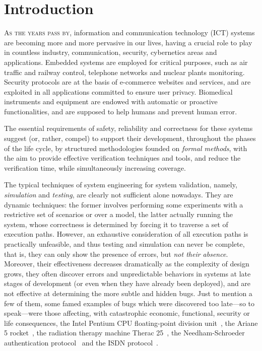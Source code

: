 \chapter{Introduction}
\label{chap:introFOR}
\minitoc\mtcskip

\lettrine[lines=3]{A}{s the years pass by,} information and communication technology (ICT) systems 
are becoming more and more pervasive in our lives, having 
a crucial role to play in countless industry, communication, security, cybernetics areas and applications.
%
Embedded systems are employed for critical purposes, 
such as air traffic and railway control, telephone networks and nuclear plants monitoring.
Security protocols are at the basis of e-commerce websites and services,
and are exploited in all applications committed to ensure user privacy.
Biomedical instruments and equipment are endowed with
automatic or proactive functionalities, %
and are supposed to help humans and prevent human error.

The essential requirements of safety, reliability and correctness for these systems suggest
(or, rather, compel)
to support their development, throughout the phases of the life cycle, %
by structured methodologies founded on \emph{formal methods}, %
with the aim to provide effective verification techniques and tools, and reduce the verification time, while simultaneously increasing coverage.

The typical techniques of system engineering for system validation, namely, \emph{simulation} and \emph{testing}, 
are clearly not sufficient alone nowadays. They are dynamic techniques: 
the former involves performing some experiments with a restrictive set of scenarios or over a model, 
the latter actually running the system, whose correctness is determined by forcing it to traverse a set of execution paths. However, an exhaustive consideration of all execution paths is practically unfeasible, and thus testing and simulation can never be complete, that is, they can only show the presence of errors, but \emph{not their absence}.
Moreover, their effectiveness decreases dramatically as the complexity of design grows, 
they often discover errors and unpredictable behaviors in systems at late stages of development (or even when they have already been deployed), and are not effective at determining the more subtle and hidden bugs.
Just to mention a few of them, some famed examples of bugs which were discovered too late---so to speak---were those affecting, with catastrophic economic, functional, security or life consequences, the Intel Pentium CPU floating-point division unit~\cite{pratt1995}, the Ariane 5 rocket~\cite{jazequel1997}, the radiation therapy machine Therac 25~\cite{thomas1994}, the Needham-Schroeder authentication protocol~\cite{Lowe1996} and the ISDN protocol~\cite{holzmann1994}.

